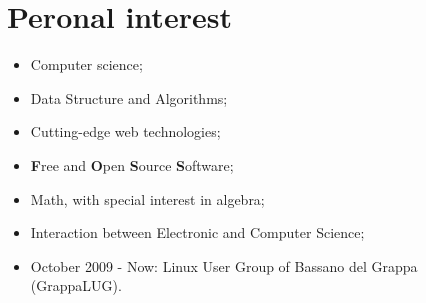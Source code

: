 \documentclass[pdftex, a4paper, 11pt]{article}
\begin{document}


\section*{Peronal interest}
\begin{itemize}
\item Computer science;
\item Data Structure and Algorithms;
\item Cutting-edge web technologies;
\item {\bf F}ree and {\bf O}pen {\bf S}ource {\bf S}oftware;
\item Math, with special interest in algebra;
\item Interaction between Electronic and Computer Science;
\item October 2009 - Now: Linux User Group of Bassano del Grappa (GrappaLUG).
\end{itemize}
\end{document}
